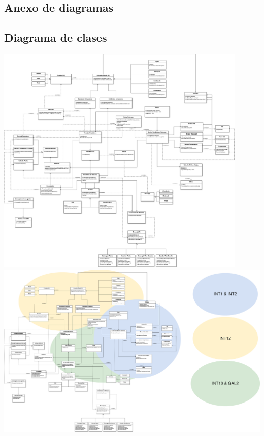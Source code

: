 \begin{landscape}
\section{Anexo de diagramas}
    \subsection{Diagrama de clases}
        \includegraphics[width=0.9\textwidth]{img/clases.png}
    \newpage
        \includegraphics[width=1.2\textwidth]{img/mapaclases.png}
    \newpage


\end{landscape}

